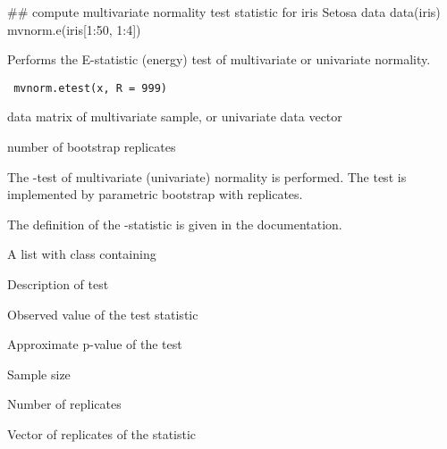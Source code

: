 \documentclass{article}
\begin{document}
\begin{SeeAlso}\relax
{}
\end{SeeAlso}
\begin{Examples}
\begin{ExampleCode}
 
 ## compute multivariate normality test statistic for iris Setosa data
 data(iris)
 mvnorm.e(iris[1:50, 1:4])
 \end{ExampleCode}
\end{Examples}

\begin{Description}\relax
Performs the E-statistic (energy) test of multivariate or univariate normality.
\end{Description}
\begin{Usage}
\begin{verbatim}
 mvnorm.etest(x, R = 999)
\end{verbatim}
\end{Usage}
\begin{Arguments}
\begin{ldescription}
\item[\code{x}] data matrix of multivariate sample, or univariate data vector
\item[\code{R}] number of bootstrap replicates 
\end{ldescription}
\end{Arguments}
\begin{Details}\relax
The -test of multivariate (univariate) normality
is performed. The test is implemented by parametric bootstrap with 
 replicates. 

The definition of the -statistic is given in the 
 documentation.\end{Details}
\begin{Value}
A list with class  containing
\begin{ldescription}
\item[\code{method}] Description of test
\item[\code{statistic}] Observed value of the test statistic
\item[\code{p.value}] Approximate p-value of the test
\item[\code{n}] Sample size
\item[\code{R}] Number of replicates
\item[\code{replicates}] Vector of replicates of the statistic
\end{ldescription}
\end{Value}
\end{document}
